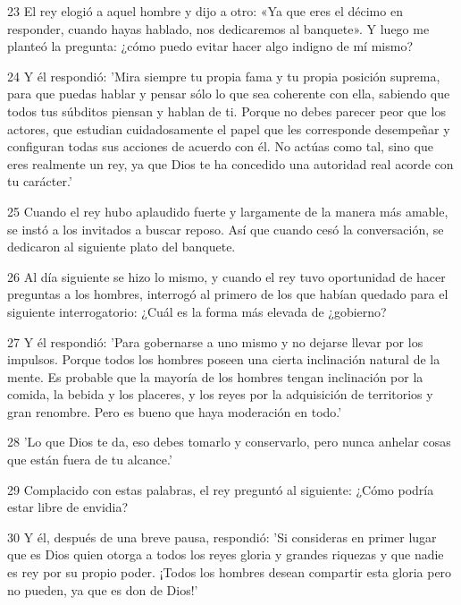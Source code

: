 \par 23 El rey elogió a aquel hombre y dijo a otro: «Ya que eres el décimo en responder, cuando hayas hablado, nos dedicaremos al banquete». Y luego me planteó la pregunta: ¿cómo puedo evitar hacer algo indigno de mí mismo?

\par 24 Y él respondió: 'Mira siempre tu propia fama y tu propia posición suprema, para que puedas hablar y pensar sólo lo que sea coherente con ella, sabiendo que todos tus súbditos piensan y hablan de ti. Porque no debes parecer peor que los actores, que estudian cuidadosamente el papel que les corresponde desempeñar y configuran todas sus acciones de acuerdo con él. No actúas como tal, sino que eres realmente un rey, ya que Dios te ha concedido una autoridad real acorde con tu carácter.'

\par 25 Cuando el rey hubo aplaudido fuerte y largamente de la manera más amable, se instó a los invitados a buscar reposo. Así que cuando cesó la conversación, se dedicaron al siguiente plato del banquete.

\par 26 Al día siguiente se hizo lo mismo, y cuando el rey tuvo oportunidad de hacer preguntas a los hombres, interrogó al primero de los que habían quedado para el siguiente interrogatorio: ¿Cuál es la forma más elevada de ¿gobierno?

\par 27 Y él respondió: 'Para gobernarse a uno mismo y no dejarse llevar por los impulsos. Porque todos los hombres poseen una cierta inclinación natural de la mente. Es probable que la mayoría de los hombres tengan inclinación por la comida, la bebida y los placeres, y los reyes por la adquisición de territorios y gran renombre. Pero es bueno que haya moderación en todo.'

\par 28 'Lo que Dios te da, eso debes tomarlo y conservarlo, pero nunca anhelar cosas que están fuera de tu alcance.'

\par 29 Complacido con estas palabras, el rey preguntó al siguiente: ¿Cómo podría estar libre de envidia?

\par 30 Y él, después de una breve pausa, respondió: 'Si consideras en primer lugar que es Dios quien otorga a todos los reyes gloria y grandes riquezas y que nadie es rey por su propio poder. ¡Todos los hombres desean compartir esta gloria pero no pueden, ya que es don de Dios!'

